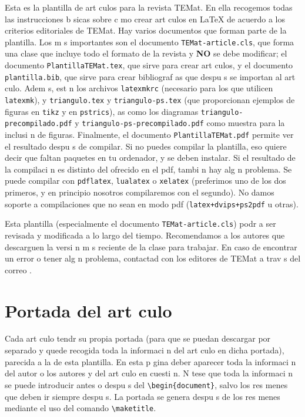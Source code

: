 \documentclass{article}
\begin{document}
Esta es la plantilla de art culos para la revista TEMat.
En ella recogemos todas las instrucciones b sicas sobre c mo crear art culos en \LaTeX{} de acuerdo a los criterios editoriales de TEMat.
Hay varios documentos que forman parte de la plantilla.
Los m s importantes son el documento \verb+TEMat-article.cls+, que forma una clase que incluye todo el formato de la revista y \textbf{NO} se debe modificar; el documento \verb+PlantillaTEMat.tex+, que sirve para crear art culos, y el documento \verb+plantilla.bib+, que sirve para crear bibliograf as que despu s se importan al art culo.
Adem s, est n los archivos \verb+latexmkrc+ (necesario para los que utilicen \verb+latexmk+), y \verb+triangulo.tex+ y \verb+triangulo-ps.tex+ (que proporcionan ejemplos de figuras en \verb+tikz+ y en \verb+pstrics+), as  como los diagramas \verb+triangulo-precompilado.pdf+ y \verb+triangulo-ps-precompilado.pdf+ como muestra para la inclusi n de figuras.
Finalmente, el documento \verb+PlantillaTEMat.pdf+ permite ver el resultado despu s de compilar.
Si no puedes compilar la plantilla, eso quiere decir que faltan paquetes en tu ordenador, y se deben instalar.
Si el resultado de la compilaci n es distinto del ofrecido en el pdf, tambi n hay alg n problema.
Se puede compilar con \verb+pdflatex+, \verb+lualatex+ o \verb+xelatex+ (preferimos uno de los dos primeros, y en principio nosotros compilaremos con el segundo).
No damos soporte a compilaciones que no sean en modo pdf (\verb|latex+dvips+ps2pdf| u otras).

Esta plantilla (especialmente el documento \verb+TEMat-article.cls+) podr a ser revisada y modificada a lo largo del tiempo.
Recomendamos a los autores que descarguen la versi n m s reciente de la clase para trabajar.
En caso de encontrar un error o tener alg n problema, contactad con los editores de TEMat a trav s del correo .

\section{Portada del art culo}

Cada art culo tendr  su propia portada (para que se puedan descargar por separado y quede recogida toda la informaci n del art culo en dicha portada), parecida a la de esta plantilla.
En esta p gina deber  aparecer toda la informaci n del autor o los autores y del art culo en cuesti n.
N tese que toda la informaci n se puede introducir antes o despu s del \verb+\begin{document}+, salvo los res menes que deben ir siempre despu s.
La portada se genera despu s de los res menes mediante el uso del comando \verb+\maketitle+.
\end{document}
